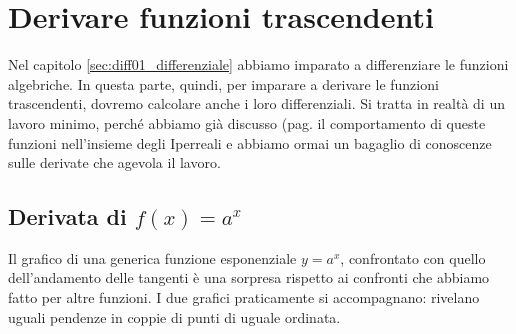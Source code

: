 \section{Derivare funzioni trascendenti}
\label{sec:diff01_deritrasc}
Nel capitolo \ref{sec:diff01_differenziale} abbiamo imparato a 
differenziare 
le funzioni algebriche. In questa parte, quindi, per imparare
a derivare le funzioni trascendenti, dovremo calcolare anche i loro 
differenziali. Si tratta in realtà di un lavoro minimo, perché abbiamo già
discusso (pag.\pageref{subsubsec:insnum_expstar} il comportamento di queste 
funzioni
nell'insieme degli Iperreali e abbiamo ormai un bagaglio di conoscenze 
sulle derivate che agevola il lavoro.
\subsection{Derivata di $f(x)=a^x$}
\label{}
Il grafico di una generica funzione esponenziale $y=a^x$, confrontato con 
quello 
dell'andamento delle tangenti è una sorpresa rispetto ai confronti che 
abbiamo
fatto per altre funzioni. I due grafici praticamente si accompagnano: 
rivelano uguali pendenze in coppie di punti di uguale ordinata.

